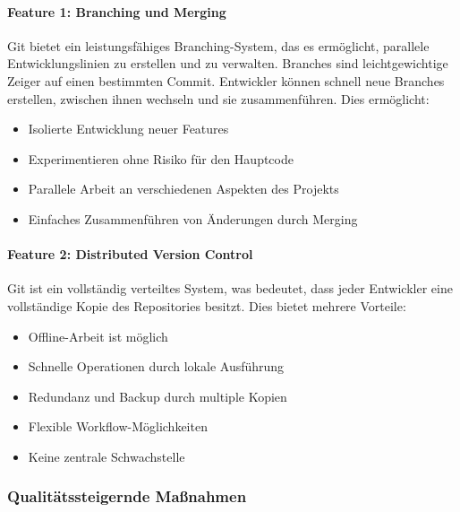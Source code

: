 \paragraph{Feature 1: Branching und Merging}
Git bietet ein leistungsfähiges Branching-System, das es ermöglicht, parallele Entwicklungslinien 
zu erstellen und zu verwalten. Branches sind leichtgewichtige Zeiger auf einen bestimmten Commit. 
Entwickler können schnell neue Branches erstellen, zwischen ihnen wechseln und sie zusammenführen. 
Dies ermöglicht:

    \begin{itemize}
        \item Isolierte Entwicklung neuer Features
        \item Experimentieren ohne Risiko für den Hauptcode
        \item Parallele Arbeit an verschiedenen Aspekten des Projekts
        \item Einfaches Zusammenführen von Änderungen durch Merging
    \end{itemize}

    \paragraph{Feature 2: Distributed Version Control}
    Git ist ein vollständig verteiltes System, was bedeutet, dass jeder Entwickler eine vollständige Kopie des Repositories besitzt.
    Dies bietet mehrere Vorteile:

    \begin{itemize}
        \item Offline-Arbeit ist möglich
        \item Schnelle Operationen durch lokale Ausführung
        \item Redundanz und Backup durch multiple Kopien
        \item Flexible Workflow-Möglichkeiten
        \item Keine zentrale Schwachstelle
    \end{itemize}






\subsubsection{Qualitätssteigernde Maßnahmen}

